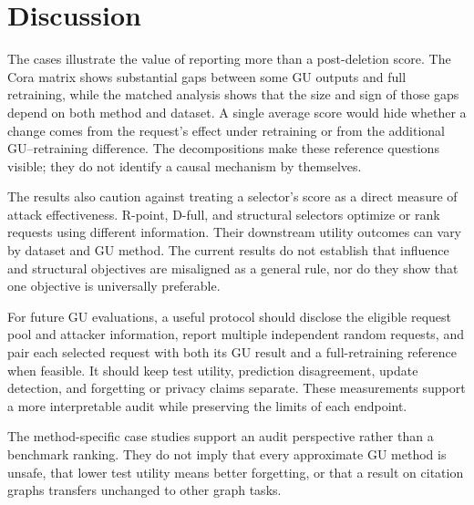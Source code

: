 \section{Discussion}
\label{sec:discussion}

The cases illustrate the value of reporting more than a post-deletion score. The Cora matrix shows substantial gaps between some GU outputs and full retraining, while the matched analysis shows that the size and sign of those gaps depend on both method and dataset. A single average score would hide whether a change comes from the request's effect under retraining or from the additional GU--retraining difference. The decompositions make these reference questions visible; they do not identify a causal mechanism by themselves.

The results also caution against treating a selector's score as a direct measure of attack effectiveness. R-point, D-full, and structural selectors optimize or rank requests using different information. Their downstream utility outcomes can vary by dataset and GU method. The current results do not establish that influence and structural objectives are misaligned as a general rule, nor do they show that one objective is universally preferable.

For future GU evaluations, a useful protocol should disclose the eligible request pool and attacker information, report multiple independent random requests, and pair each selected request with both its GU result and a full-retraining reference when feasible. It should keep test utility, prediction disagreement, update detection, and forgetting or privacy claims separate. These measurements support a more interpretable audit while preserving the limits of each endpoint.

The method-specific case studies support an audit perspective rather than a benchmark ranking. They do not imply that every approximate GU method is unsafe, that lower test utility means better forgetting, or that a result on citation graphs transfers unchanged to other graph tasks.
